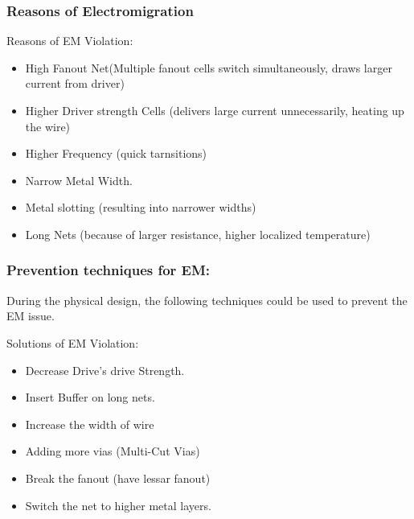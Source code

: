 \documentclass{beamer}
\begin{document}
	\begin{frame}
		\frametitle{Reasons of Electromigration}
		\begin{alertblock}{Reasons of EM Violation:}
			\begin{itemize}
				\item High Fanout Net(Multiple fanout cells switch simultaneously, draws larger current from driver)
				\item Higher Driver strength Cells (delivers large current unnecessarily, heating up the wire)
				\item Higher Frequency (quick tarnsitions)
				\item Narrow Metal Width.
				\item Metal slotting (resulting into narrower widths)
				\item Long Nets (because of larger resistance, higher localized temperature)
			\end{itemize}
		\end{alertblock}
	\end{frame}	
\begin{frame}
	\frametitle{Prevention techniques for  EM:}
	During the physical design, the following techniques could be used to prevent the EM issue.
	
	
	\begin{block}{Solutions of EM Violation:}
		\begin{itemize}
			
			\item Decrease Drive's drive Strength.
			\item Insert Buffer on long nets.
			\item Increase the width of wire
			\item Adding more vias (Multi-Cut Vias)
			\item Break the fanout (have lessar fanout)
			\item Switch the net to higher metal layers.
		\end{itemize}
	\end{block}
\end{frame}
	
\end{document}

